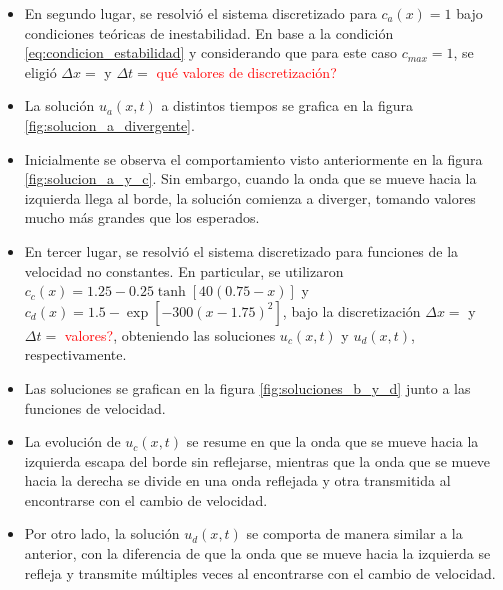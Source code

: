 \documentclass[aps,prb,twocolumn,superscriptaddress,floatfix,longbibliography,10pt]{revtex4-2}
\newcounter{para}
\begin{document}
\begin{itemize}
  \item En segundo lugar, se resolvió el sistema discretizado para $c_a(x) = 1$ bajo condiciones teóricas de inestabilidad. En base a la condición \ref{eq:condicion_estabilidad} y considerando que para este caso $c_{max} = 1$, se eligió $\Delta x = $ y $\Delta t = $ \textcolor{red}{qué valores de discretización?}
  \item La solución $u_a(x,t)$ a distintos tiempos se grafica en la figura \ref{fig:solucion_a_divergente}.
  \item Inicialmente se observa el comportamiento visto anteriormente en la figura \ref{fig:solucion_a_y_c}. Sin embargo, cuando la onda que se mueve hacia la izquierda llega al borde, la solución comienza a diverger, tomando valores mucho más grandes que los esperados.
\end{itemize}


\begin{itemize}
  \item En tercer lugar, se resolvió el sistema discretizado para funciones de la velocidad no constantes. En particular, se utilizaron $c_c(x) = 1.25 -0.25 \tanh{[40(0.75-x)]}$ y $c_d(x) = 1.5 - \exp{[-300(x-1.75)^2]}$, bajo la discretización $\Delta x = $ y $\Delta t = $ \textcolor{red}{valores?}, obteniendo las soluciones $u_c(x,t)$ y $u_d(x,t)$, respectivamente.
  \item Las soluciones se grafican en la figura \ref{fig:soluciones_b_y_d} junto a las funciones de velocidad.
  \item La evolución de $u_c(x,t)$ se resume en que la onda que se mueve hacia la izquierda escapa del borde sin reflejarse, mientras que la onda que se mueve hacia la derecha se divide en una onda reflejada y otra transmitida al encontrarse con el cambio de velocidad.
  \item Por otro lado, la solución $u_d(x,t)$ se comporta de manera similar a la anterior, con la diferencia de que la onda que se mueve hacia la izquierda se refleja y transmite múltiples veces al encontrarse con el cambio de velocidad.
\end{itemize}
\end{document}
